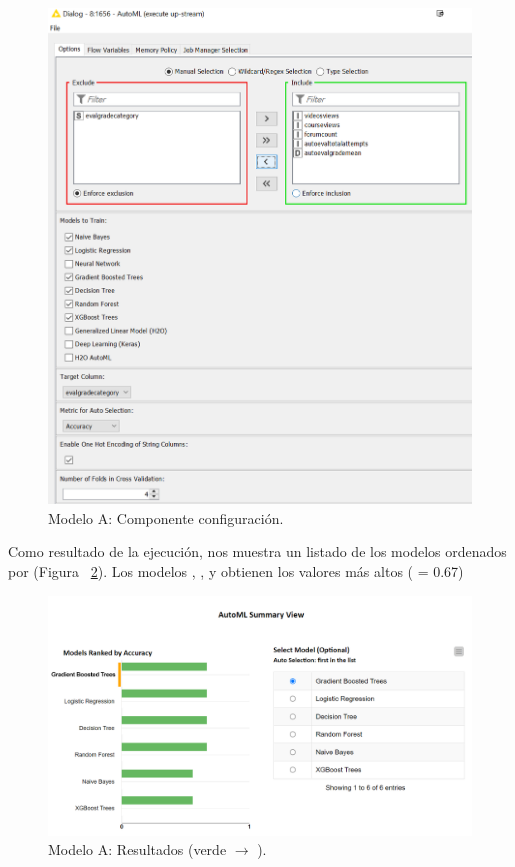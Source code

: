 \begin{figure}[!htb]
	\centering
	\includegraphics[width=1\textwidth]{img/workflowA2.png}
	\caption{Modelo A: Componente  configuración.}
	\label{fig:workflowA2}
\end{figure}
\FloatBarrier

Como resultado de la ejecución,  nos muestra un listado de los modelos ordenados por  (Figura ~\ref{fig:workflowA4}). 
Los modelos , ,  y  obtienen los valores más altos ( = 0.67)

\begin{figure}[!htb]
	\centering
	\includegraphics[width=1\textwidth]{img/workflowA4.png}
	\caption{Modelo A: Resultados (verde $\rightarrow$ ).}
	\label{fig:workflowA4}
\end{figure}
\FloatBarrier

